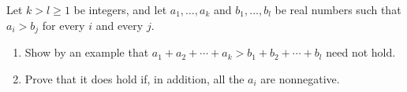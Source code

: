 Let $k>l\ge1$ be integers, and let $a_1,\dots,a_k$ and $b_1,\dots,b_l$ be real numbers such that $a_i>b_j$ for every $i$ and every $j$.
\begin{enumerate}
\item[(a)] Show by an example that $a_1+a_2+\cdots+a_k>b_1+b_2+\cdots+b_l$ need not hold.
\item[(b)] Prove that it does hold if, in addition, all the $a_i$ are nonnegative.
\end{enumerate}
